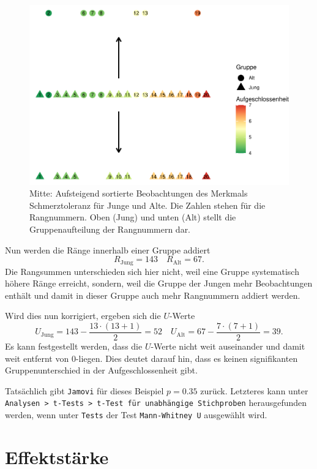 \documentclass[
]{book}
\theoremstyle{definition}
\theoremstyle{definition}
\theoremstyle{definition}
\theoremstyle{definition}
\theoremstyle{remark}
\begin{document}
\begin{figure}
\centering
\includegraphics{aps_statistik1_files/figure-latex/exm-aufgeschlossenheit-jung-alt-utest-oder-1.pdf}
\caption{\label{fig:exm-aufgeschlossenheit-jung-alt-utest-oder}Mitte: Aufsteigend sortierte Beobachtungen des Merkmals Schmerztoleranz für Junge und Alte. Die Zahlen stehen für die Rangnummern. Oben (Jung) und unten (Alt) stellt die Gruppenaufteilung der Rangnummern dar.}
\end{figure}

Nun werden die Ränge innerhalb einer Gruppe addiert
\[R_\text{Jung} = 143   \quad R_\text{Alt} = 67.\]
Die Rangsummen unterschieden sich hier nicht, weil eine Gruppe systematisch höhere Ränge erreicht, sondern, weil die Gruppe der Jungen mehr Beobachtungen enthält und damit in dieser Gruppe auch mehr Rangnummern addiert werden.

Wird dies nun korrigiert, ergeben sich die \(U\)-Werte
\[U_\text{Jung} = 143 - \frac{13\cdot(13+1)}{2} = 52 \quad U_\text{Alt} = 67-\frac{7\cdot(7+1)}{2} = 39.\]
Es kann festgestellt werden, dass die \(U\)-Werte nicht weit auseinander und damit weit entfernt von \(0\)-liegen. Dies deutet darauf hin, dass es keinen signifikanten Gruppenunterschied in der Aufgeschlossenheit gibt.

Tatsächlich gibt \texttt{Jamovi} für dieses Beispiel \(p = 0.35\) zurück. Letzteres kann unter \texttt{Analysen\ \textgreater{}\ t-Tests\ \textgreater{}\ t-Test\ für\ unabhängige\ Stichproben} herausgefunden werden, wenn unter \texttt{Tests} der Test \texttt{Mann-Whitney\ U} ausgewählt wird.

\section{Effektstärke}\label{effektstuxe4rke}
\end{document}
